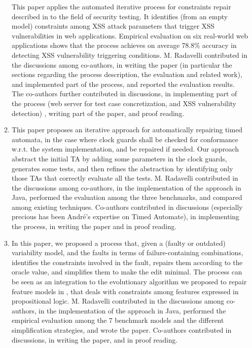 \documentclass [a4paper, 12pt, twoside]{report}
\theoremstyle{plain}
\theoremstyle{definition}
\theoremstyle{remark}
\theoremstyle{plain}
\theoremstyle{plain}
\theoremstyle{remark}
\begin{document}
\begin{enumerate}
	This paper applies the automated iterative process for constraints repair described in \cite{gargantini_combinatorial_2017} to the field of security testing. It identifies (from an empty model) constraints among XSS attack parameters that trigger XSS vulnerabilities in web applications. Empirical evaluation on six real-world web applications shows that the process achieves on average 78.8\% accuracy in detecting XSS vulnerability triggering conditions.
	M. Radavelli contributed in the discussions among co-authors, in writing the paper (in particular the sections regarding the process description, the evaluation and related work), and implemented part of the process, and reported the evaluation results.
	The co-authors further contributed in discussions, in implementing part of the process (web server for test case concretization, and XSS vulnerability detection) , writing part of the paper, and proof reading.
	
	\item \cite{andre2019repairing} 

	This paper proposes an iterative approach for automatically repairing timed automata, in the case where clock guards shall be checked for conformance w.r.t. the system implementation, and be repaired if needed. 
	Our approach abstract the initial TA by adding some parameters in the clock guards, generates some tests, and then refines the abstraction by identifying only those TAs that correctly evaluate all the tests.
	M. Radavelli contributed in the discussions among co-authors, in the implementation of the approach in Java, performed the evaluation among the three benchmarks, and compared among existing techniques.
	Co-authors contributed in discussions (especially precious has been André's expertise on Timed Automate), in implementing the process, in writing the paper and in proof reading.
	
	\item \cite{arcaini2019varivolution} 

	In this paper, we proposed a process that, given a (faulty or outdated) variability model, and the faults in terms of failure-containing combinations, identifies the constraints involved in the fault, repairs them according to the oracle value, and simplifies them to make the edit minimal. 
	The process can be seen as an integration to the evolutionary algorithm we proposed to repair feature models in \cite{arcaini_evolutionary_2018,arcaini2019achieving}, that deals with constraints among features expressed in propositional logic. 
	M. Radavelli contributed in the discussions among co-authors, in the implementation of the approach in Java, performed the empirical evaluation among the 7 benchmark models and the different simplification strategies, and wrote the paper.
	Co-authors contributed in discussions, in writing the paper, and in proof reading.

\end{enumerate}
\end{document}
